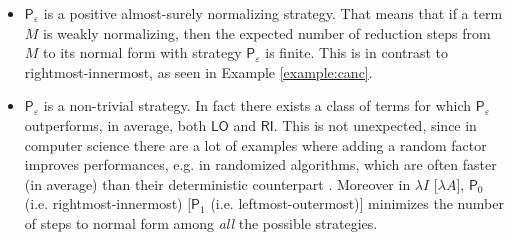 \documentclass[english]{llncs}
\newcommand{\termone}{M}
\newcommand{\pslo}{\mathsf{LO}}
\newcommand{\psri}{\mathsf{RI}}
\begin{document}
\begin{itemize}
	\item $\mathsf{P}_\varepsilon$ is a positive almost-surely normalizing strategy. That means that if a term $\termone$ is weakly normalizing, then the expected number of reduction steps from $\termone$ to its normal form with strategy $\mathsf{P}_\varepsilon$ is finite. This is in contrast to rightmost-innermost, as seen in Example \ref{example:canc}.
	\item $\mathsf{P}_\varepsilon$ is a non-trivial strategy. In fact there exists a class of terms for which $\mathsf{P}_\varepsilon$ outperforms, in average, both $\pslo$ and $\psri$. This is not unexpected, since in computer science there are a lot of examples where adding a random factor improves performances, e.g. in randomized algorithms, which are often faster (in average) than their deterministic counterpart \cite{motwani_randomized_1995}. 
	 Moreover in $\lambda I$ [$\lambda A]$, $\mathsf{P}_0$ (i.e. rightmost-innermost) [$\mathsf{P}_1$ (i.e. leftmost-outermost)] minimizes the number of steps to normal form among \emph{all} the possible strategies.
\end{itemize}


\end{document}
